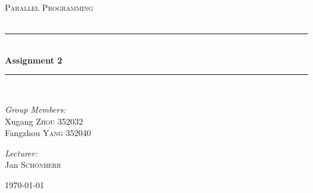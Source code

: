\documentclass[a4paper, 14pt]{article}
\newcommand{\HRule}{\rule{\linewidth}{0.5mm}}
\begin{document}
\begin{titlepage}
\begin{center}
\vfill
\textsc{\LARGE Parallel Programming}\\[1.5cm]
\textsc{\Large }\\[0.5cm]

\HRule \\[0.4cm]
{\huge \bfseries Assignment 2}\\[0.4cm]
\HRule \\[1.5cm]
\begin{minipage}{0.4\textwidth}
\begin{flushleft} \large
\emph{Group Members:}\\
Xugang \textsc{Zhou} 352032\\
Fangzhou \textsc{Yang} 352040
\end{flushleft}
\end{minipage}
\begin{minipage}{0.4\textwidth}
\begin{flushright} \large
\emph{Lecturer:} \\
Jan \textsc{Sch\"onherr}\\
\end{flushright}
\end{minipage}
\vfill
{\large \today}\\
\end{center}
\end{titlepage}
\thispagestyle{fancy}
\end{document}
